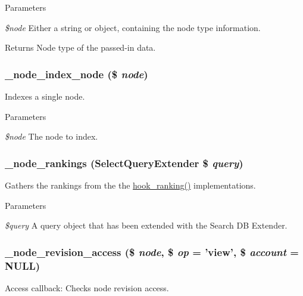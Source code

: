 \begin{DoxyParams}{Parameters}
\item[{\em \$node}]Either a string or object, containing the node type information.\end{DoxyParams}
\begin{DoxyReturn}{Returns}
Node type of the passed-\/in data. 
\end{DoxyReturn}
\hypertarget{node_8module_a18866988a8ff7ed81fb0edda6d1b9d97}{
\subsubsection[{\_\-node\_\-index\_\-node}]{\setlength{\rightskip}{0pt plus 5cm}\_\-node\_\-index\_\-node (\$ {\em node})}}
\label{node_8module_a18866988a8ff7ed81fb0edda6d1b9d97}
Indexes a single node.


\begin{DoxyParams}{Parameters}
\item[{\em \$node}]The node to index. \end{DoxyParams}
\hypertarget{node_8module_ae44d40f8a64bf935ce7c6fce9af6425b}{
\subsubsection[{\_\-node\_\-rankings}]{\setlength{\rightskip}{0pt plus 5cm}\_\-node\_\-rankings ({\bf SelectQueryExtender} \$ {\em query})}}
\label{node_8module_ae44d40f8a64bf935ce7c6fce9af6425b}
Gathers the rankings from the the \hyperlink{group__node__api__hooks_gaf7a28ce3230dc96833ea5338fd26f43c}{hook\_\-ranking()} implementations.


\begin{DoxyParams}{Parameters}
\item[{\em \$query}]A query object that has been extended with the Search DB Extender. \end{DoxyParams}
\hypertarget{node_8module_a79b5bb64052b724d7e1ec53890762174}{
\subsubsection[{\_\-node\_\-revision\_\-access}]{\setlength{\rightskip}{0pt plus 5cm}\_\-node\_\-revision\_\-access (\$ {\em node}, \/  \$ {\em op} = {\ttfamily '{\bf view}'}, \/  \$ {\em account} = {\ttfamily NULL})}}
\label{node_8module_a79b5bb64052b724d7e1ec53890762174}
Access callback: Checks node revision access.


